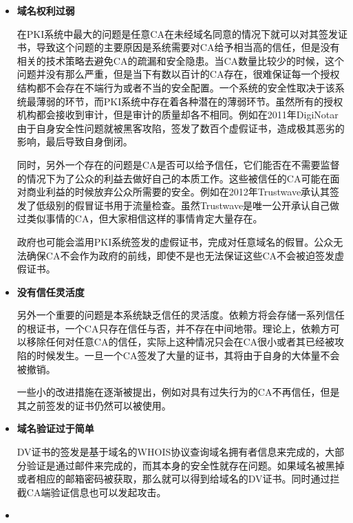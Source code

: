 \begin{itemize}
	\item

	\noindent\textbf{域名权利过弱}

	在PKI系统中最大的问题是任意CA在未经域名同意的情况下就可以对其签发证书，导致这个问题的主要原因是系统需要对CA给予相当高的信任，但是没有相关的技术策略去避免CA的疏漏和安全隐患。当CA数量比较少的时候，这个问题并没有那么严重，但是当下有数以百计的CA存在，很难保证每一个授权结构都不会存在不端行为或者不当的安全配置。一个系统的安全性取决于该系统最薄弱的环节，而PKI系统中存在着各种潜在的薄弱环节。虽然所有的授权机构都会接收到审计，但是审计的质量却各不相同。例如在2011年DigiNotar由于自身安全性问题就被黑客攻陷\cite{prins2011diginotar}，签发了数百个虚假证书，造成极其恶劣的影响，最后导致自身倒闭。

	同时，另外一个存在的问题是CA是否可以给予信任，它们能否在不需要监督的情况下为了公众的利益去做好自己的本质工作。这些被信任的CA可能在面对商业利益的时候放弃公众所需要的安全。例如在2012年Trustwave承认其签发了低级别的假冒证书用于流量检查。虽然Trustwave是唯一公开承认自己做过类似事情的CA，但大家相信这样的事情肯定大量存在。

	政府也可能会滥用PKI系统签发的虚假证书，完成对任意域名的假冒。公众无法确保CA不会作为政府的前线，即使不是也无法保证这些CA不会被迫签发虚假证书。



	\item

	\noindent\textbf{没有信任灵活度}

	另外一个重要的问题是本系统缺乏信任的灵活度。依赖方将会存储一系列信任的根证书，一个CA只存在信任与否，并不存在中间地带。理论上，依赖方可以移除任何对任意CA的信任，实际上这种情况只会在CA很小或者其已经被攻陷的时候发生。一旦一个CA签发了大量的证书，其将由于自身的大体量不会被撤销。

	一些小的改进措施在逐渐被提出，例如对具有过失行为的CA不再信任，但是其之前签发的证书仍然可以被使用。

	\item

	\noindent\textbf{域名验证过于简单}

	DV证书的签发是基于域名的WHOIS协议查询域名拥有者信息来完成的，大部分验证是通过邮件来完成的，而其本身的安全性就存在问题。如果域名被黑掉或者相应的邮箱密码被获取，那么就可以得到给域名的DV证书。同时通过拦截CA端验证信息也可以发起攻击。



	\item 


\end{itemize}
